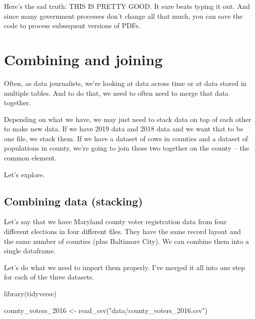 \documentclass[
  letterpaper,
  DIV=11,
  numbers=noendperiod]{scrreprt}
\newenvironment{Shaded}{\begin{snugshade}}{\end{snugshade}}
\newcommand{\FunctionTok}[1]{\textcolor[rgb]{0.28,0.35,0.67}{#1}}
\newcommand{\NormalTok}[1]{\textcolor[rgb]{0.00,0.23,0.31}{#1}}
\newcommand{\OtherTok}[1]{\textcolor[rgb]{0.00,0.23,0.31}{#1}}
\newcommand{\StringTok}[1]{\textcolor[rgb]{0.13,0.47,0.30}{#1}}
\begin{document}
Here's the sad truth: THIS IS PRETTY GOOD. It sure beats typing it out.
And since many government processes don't change all that much, you can
save the code to process subsequent versions of PDFs.


\hypertarget{combining-and-joining}{%
\chapter{Combining and joining}\label{combining-and-joining}}

Often, as data journalists, we're looking at data across time or at data
stored in multiple tables. And to do that, we need to often need to
merge that data together.

Depending on what we have, we may just need to stack data on top of each
other to make new data. If we have 2019 data and 2018 data and we want
that to be one file, we stack them. If we have a dataset of cows in
counties and a dataset of populations in county, we're going to join
those two together on the county -- the common element.

Let's explore.

\hypertarget{combining-data-stacking}{%
\section{Combining data (stacking)}\label{combining-data-stacking}}

Let's say that we have Maryland county voter registration data from four
different elections in four different files. They have the same record
layout and the same number of counties (plus Baltimore City). We can
combine them into a single dataframe.

Let's do what we need to import them properly. I've merged it all into
one step for each of the three datasets.

\begin{Shaded}
\begin{Highlighting}[]
\FunctionTok{library}\NormalTok{(tidyverse)}
\end{Highlighting}
\end{Shaded}

\begin{Shaded}
\begin{Highlighting}[]
\NormalTok{county\_voters\_2016 }\OtherTok{\textless{}{-}} \FunctionTok{read\_csv}\NormalTok{(}\StringTok{"data/county\_voters\_2016.csv"}\NormalTok{)}
\end{Highlighting}
\end{Shaded}
\end{document}
